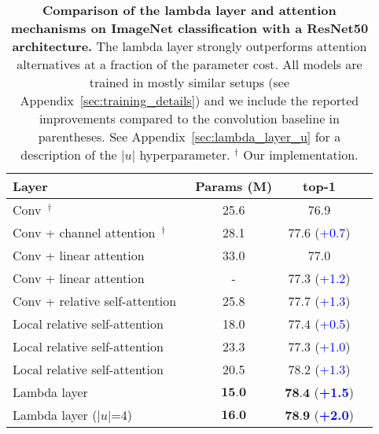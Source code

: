 \documentclass{article} \usepackage{iclr2021_conference,times}
\begin{document}
\begin{table}[ht!]
  \begin{center}
  \small
  \begin{tabular}{lccc}
    \toprule
    Layer & Params (M) & top-1 \\
    \midrule
    Conv~\citep{he2015deep}$^\dagger$ & 25.6 & 76.9 \\
    \midrule
    Conv + channel attention~\citep{hu2017squeeze}$^\dagger$ & 28.1 & $77.6$ (\textcolor{blue}{+0.7}) \\
    \midrule
    Conv + linear attention~\citep{chen2018double} & 33.0 & 77.0 \\ Conv + linear attention~\citep{shen2018efficient} & - & $77.3$ (\textcolor{blue}{+1.2}) \\ Conv + relative self-attention~\citep{bello2019aacn} & 25.8 & $77.7$ (\textcolor{blue}{+1.3}) \\
    \midrule Local relative self-attention~\citep{ramachandran2019sasa} & 18.0 & $77.4$ (\textcolor{blue}{+0.5}) \\
    Local relative self-attention~\citep{hu2019local} & 23.3 & $77.3$ (\textcolor{blue}{+1.0}) \\
    Local relative self-attention~\citep{zhao2020exploring} & 20.5 & $78.2$ (\textcolor{blue}{+1.3}) \\
    \midrule
    Lambda layer & $\textbf{15.0}$ & $\textbf{78.4}$ (\textbf{\textcolor{blue}{+1.5}}) \\
    Lambda layer ($|u|$=4) & $\textbf{16.0}$ & $\textbf{78.9}$ (\textbf{\textcolor{blue}{+2.0}}) \\
    \bottomrule
  \end{tabular}
  \caption{\textbf{Comparison of the lambda layer and attention mechanisms on ImageNet classification with a ResNet50 architecture.}
  The lambda layer strongly outperforms attention alternatives at a fraction of the parameter cost.
  All models are trained in mostly similar setups (see Appendix~\ref{sec:training_details}) and we include the reported improvements compared to the convolution baseline in parentheses.
  See Appendix~\ref{sec:lambda_layer_u} for a description of the $|u|$ hyperparameter.
  $^{\dagger}$ Our implementation.}
  \label{tab:resnet50}
  \vspace{-0.4cm}
  \end{center}
\end{table}

\vspace{-0.1cm}
\end{document}
